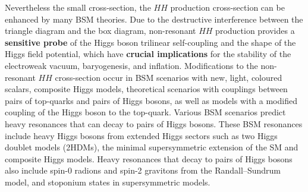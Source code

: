 \documentclass[twoside,11pt]{report}
\begin{document}
    Nevertheless the small cross-section, the $HH$ production cross-section can be enhanced by many BSM theories.
    Due to the destructive interference between the triangle diagram and the box diagram,
    non-resonant $HH$ production provides a \textbf{sensitive probe} of the Higgs boson trilinear 
    self-coupling and the shape of the Higgs field potential, 
    which have \textbf{crucial implications} for the stability of the electroweak vacuum, 
    baryogenesis, and inflation. 
    Modifications to the non-resonant $HH$ cross-section occur in BSM scenarios with new, 
    light, coloured scalars, composite Higgs models, 
    theoretical scenarios with couplings between pairs of top-quarks and pairs of Higgs bosons, 
    as well as models with a modified coupling of the Higgs boson to the top-quark. 
    Various BSM scenarios predict heavy resonances that can decay to pairs of Higgs bosons. 
    These BSM resonances include heavy Higgs bosons from extended Higgs sectors such as two Higgs doublet 
    models (2HDMs), the minimal supersymmetric extension of the 
    SM and composite Higgs models. Heavy resonances that decay 
    to pairs of Higgs bosons also include spin-0 radions and spin-2 gravitons from the 
    Randall--Sundrum model, and stoponium states in supersymmetric models. 
\end{document}
